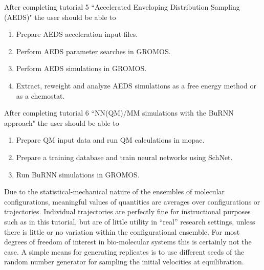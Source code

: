 %
After completing tutorial 5 ``Accelerated Enveloping Distribution Sampling (AEDS)" the user should be able to
\begin{enumerate}
\item Prepare AEDS acceleration input files.
\item Perform AEDS parameter searches in GROMOS.
\item Perform AEDS simulations in GROMOS.
\item Extract, reweight and analyze AEDS simulations as a free energy method or as a chemostat.
\end{enumerate}
%
After completing tutorial 6 “NN(QM)/MM simulations with the BuRNN approach" the user should be able to
\begin{enumerate}
\item Prepare QM input data and run QM calculations in mopac.
\item Prepare a training database and train neural networks using SchNet.
\item Run BuRNN simulations in GROMOS.
\end{enumerate}
%
Due to the statistical-mechanical nature of the ensembles of molecular configurations, meaningful values of quantities are averages over configurations or trajectories. Individual trajectories are perfectly fine for instructional purposes such as in this tutorial, but are of little utility in ``real'' research settings, unless there is little or no variation within the configurational ensemble. 
For most degrees of freedom of interest in bio-molecular systems this is certainly not the case. A simple means for generating replicates is to use different seeds of the random number generator for sampling the initial velocities at equilibration.



